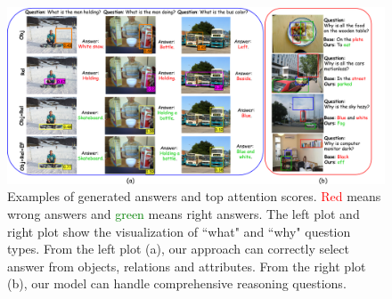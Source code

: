 \documentclass[letterpaper]{article} %
\begin{document}

\begin{figure}[ht] 
    \vspace{-0.5in}
    \centering 
    \includegraphics[width=1\textwidth]{./pic/visual_aaai2.pdf} 
    \caption{Examples of generated answers and top attention scores. \textcolor{red}{Red} means wrong answers and \textcolor{green}{green} means right answers. The left plot and right plot show the visualization of ``what" and ``why" question types. From the left plot (a), our approach can correctly select answer from objects, relations and attributes. From the right plot (b), our model can handle comprehensive reasoning questions.} 
    \label{visual} 
    \vspace{-0.1in}
\end{figure}
\end{document}
